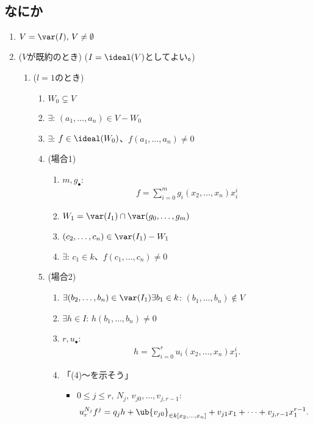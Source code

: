 \newpage
\subsection{なにか}
\label{sub:なにか}

\begin{enumerate}
  \item $V=\var(I),\, V\neq \emptyset$
  \item
  ($V$が既約のとき) ($I=\ideal(V)$としてよい。)
  \begin{enumerate}
    \item ($l=1$のとき)
  \begin{enumerate}
    \item $W_0 \subsetneq V$
    \item $\exists$: $(a_1,\dots,a_n) \in V-W_0$
    \item $\exists$: $f\in \ideal(W_0)$、$f(a_1,\dots,a_n) \neq 0$
    \item (場合1)
    \begin{enumerate}
      \item $m,g_\bullet$:
      \begin{align}
        f=\sum_{i=0}^m g_i(x_2,\dots,x_n) x_i^i
      \end{align}
      \item $W_1 = \var(I_1)\cap \var(g_0,\dots,g_m)$
      \item $(c_2,\dots,c_n) \in \var(I_1)-W_1$
      \item $\exists$: $c_1 \in k$、$f(c_1,\dots,c_n) \neq 0$
    \end{enumerate}
    \item (場合2)
    \begin{enumerate}
      \item $\exists (b_2,\dots,b_n) \in \var(I_1) \exists b_1 \in k$:
      $(b_1,\dots,b_n) \notin V$
      \item $\exists h\in I$: $h(b_1,\dots,b_n) \neq 0$
      \item $r, u_\bullet$:
      \begin{align}
        h=\sum_{i=0}^r u_i(x_2,\dots,x_n) x_1^i.
      \end{align}
      \item 「(4)～を示そう」
      \begin{itemize}
        \item $0\le j\le r,\, N_j,\, v_{j0},\dots, v_{j,r-1}$:
        \begin{align}
          u_r^{N_j}f^j =
          q_j h + \ub{v_{j0}}_{\in k[x_2,\dots,x_n]} + v_{j1}x_1  + \dots + v_{j,r-1}x_1^{r-1}.

\end{align}
\end{itemize}
\end{enumerate}
\end{enumerate}
\end{enumerate}
\end{enumerate}
